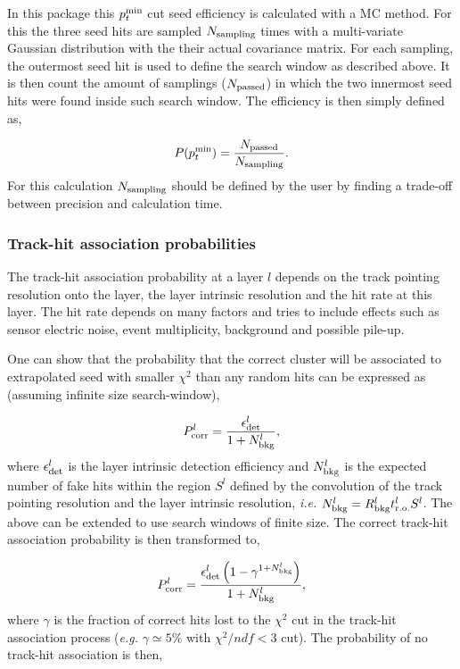 In this package this $p^{\rm min}_t$ cut seed efficiency is calculated with a MC method. For this the three seed hits are sampled $N_{\rm sampling}$ times with a multi-variate 
Gaussian distribution with the their actual covariance matrix. For each sampling, the outermost seed hit is used to define the search window as described above. It is then 
count the amount of samplings ($N_{\rm passed}$) in which the two innermost seed hits were found inside such search window. The efficiency is then simply defined as,

\begin{equation}
 P(p^{\rm min}_t) = \frac{N_{\rm passed}}{N_{\rm sampling}}.
\end{equation}
\noindent
For this calculation $N_{\rm sampling}$ should be defined by the user by finding a trade-off between precision and calculation time.

\subsubsection*{Track-hit association probabilities}

The track-hit association probability at a layer $l$ depends on the track pointing resolution onto the layer, the layer intrinsic resolution and the hit rate at this layer. 
The hit rate depends on many factors and tries to include effects such as sensor electric noise, event multiplicity, background and possible pile-up.

One can show that the probability that the correct cluster will be associated to extrapolated seed with smaller $\chi^2$ than any random hits can be expressed as 
(assuming infinite size search-window),

\begin{equation}
 P^{l}_{\rm corr} = \frac{\epsilon^l_{\rm det}}{1 + N^l_{\rm bkg}},
\end{equation}
\noindent
where $\epsilon^l_{\rm det}$ is the layer intrinsic detection efficiency and $N^l_{\rm bkg}$ is the expected number of fake hits within the region $S^l$ defined 
by the convolution of the track pointing resolution and the layer intrinsic resolution, {\it i.e.} $N^l_{\rm bkg} = R^l_{\rm bkg} t^l_{\rm r.o.} S^l$.
The above can be extended to use search windows of finite size. The correct track-hit association probability is then transformed to,

\begin{equation}
  P^{l}_{\rm corr} = \frac{\epsilon^{l}_{\rm det} \left( 1 - \gamma^{1 + N^l_{\rm bkg}} \right)}{1 + N^l_{\rm bkg}},
\end{equation}
\noindent
where $\gamma$ is the fraction of correct hits lost to the $\chi^2$ cut in the track-hit association process ({\it e.g.} $\gamma \simeq 5\%$ with $\chi^2/ndf < 3$ cut). 
The probability of no track-hit association is then,

